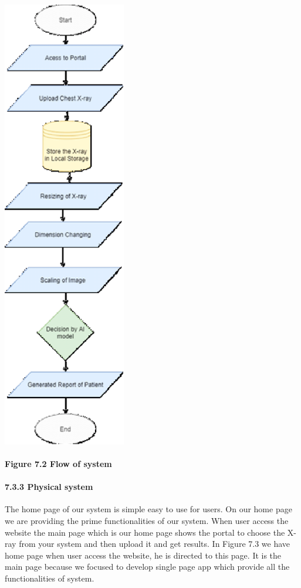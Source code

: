 \documentclass{article} %
\begin{document}
\noindent \includegraphics*[width=2.11in, height=7.89in, keepaspectratio=false]{image35}

\noindent \textbf{Figure 7.2 Flow of system}

\noindent 
\paragraph{7.3.3 Physical system}

\noindent The home page of our system is simple easy to use for users. On our home page we are providing the prime functionalities of our system. When user access the website the main page which is our home page shows the portal to choose the X-ray from your system and then upload it and get results. In Figure 7.3 we have home page when user access the website, he is directed to this page. It is the main page because we focused to develop single page app which provide all the functionalities of system.
\end{document}
